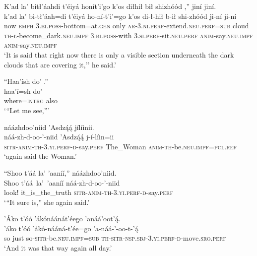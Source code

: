 \ea\label{ex:text5-4-5}
K’ad la’ bitł’áahdi t’éiyá honít’i’go k’os diłhił bił shizhóód ,'' jiní jiní.\\
\gll k’ad	la’	bi-tł’áah=di	t’éiyá	ho-ní-t’i’=go	k’os	di-ł-hił	b-ił	shi-zhóód	ji-ní	ji-ní\\
     now	\textsc{emph}	3.\textsc{bi}.\textsc{poss}-bottom=at.\textsc{gen}	only	\textsc{ar}-3.\textsc{ni}.\textsc{perf}-extend.\textsc{neu}.\textsc{perf}=\textsc{sub}	cloud	\textsc{th}-\textsc{ł}-become\_dark.\textsc{neu}.\textsc{impf}	3.\textsc{bi}.\textsc{poss}-with	3.\textsc{si}.\textsc{perf}-sit.\textsc{neu}.\textsc{perf}	\textsc{anim}-say.\textsc{neu}.\textsc{impf}	\textsc{anim}-say.\textsc{neu}.\textsc{impf}\\
\glt `It is said that right now there is only a visible section underneath the dark clouds that are covering it,'' he said.'
\z

\ea\label{ex:text5-4-6}
``Haa’ísh do’ .''\\
\gll haa’í=sh	do’\\
     where=\textsc{intrg}	also\\
\glt `“Let me see,'''
\z

\ea\label{ex:text5-4-7}
náázhdoo’niid ’Asdzą́ą́ jílíinii.\\
\gll náá-zh-d-oo-’-niid	’Asdzą́ą́	j-í-líin=ii\\
     \textsc{sitr}-\textsc{anim}-\textsc{th}-3.\textsc{yi}.\textsc{perf}-\textsc{d}-say.\textsc{perf}	The\_Woman	\textsc{anim}-\textsc{th}-be.\textsc{neu}.\textsc{impf}=\textsc{pcl}.\textsc{ref}\\
\glt `again said the Woman.'
\z

\newpage
\ea\label{ex:text5-4-8}
``Shoo t’áá la’ ’aaníí,'' náázhdoo’niid.\\
\gll Shoo	t’áá~la’~{’aaníí}	náá-zh-d-oo-’-niid\\
     look!	it\_is\_the\_truth	\textsc{sitr}-\textsc{anim}-\textsc{th}-3.\textsc{yi}.\textsc{perf}-\textsc{d}-say.\textsc{perf}\\
\glt `“It sure is,'' she again said.'
\z

\ea\label{ex:text5-4-9}
’Áko t’óó ’ákónáánát’éego ’anáá’oot’ą́.\\
\gll ’áko	t’óó	’ákó-nááná-t’ée=go	’a-náá-’-oo-t-’ą́\\
     so	just	so-\textsc{sitr}-be.\textsc{neu}.\textsc{impf}=\textsc{sub}	\textsc{th}-\textsc{sitr}-\textsc{nsp}.\textsc{sbj}-3.\textsc{yi}.\textsc{perf}-\textsc{d}-move.\textsc{sro}.\textsc{perf}\\
\glt `And it was that way again all day.'
\z

